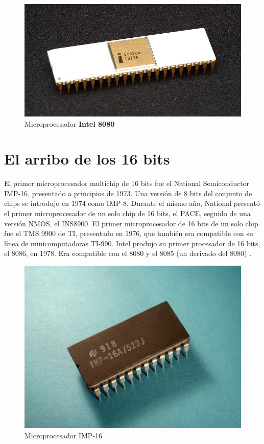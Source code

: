 \begin{figure}[htb]
	\centering
	\includegraphics[scale = 0.2]{Graphics/8080_microprocessorr.jpg}
	\caption{Microprocesador  \textbf{Intel 8080}}
	\label{fig:14}
\end{figure}

\section{El arribo de los 16 bits}

El primer microprocesador multichip de 16 bits fue el National Semiconductor IMP-16, presentado a principios de 1973. Una versión de 8 bits del conjunto de 
chips se introdujo en 1974 como IMP-8. Durante el mismo año, National presentó el primer microprocesador de un solo chip de 16 bits, el PACE, seguido de una 
versión NMOS, el INS8900. El primer microprocesador de 16 bits de un solo chip fue el TMS 9900 de TI, presentado en 1976, que también era compatible con su 
línea de minicomputadoras TI-990. Intel produjo su primer procesador de 16 bits, el 8086, en 1978. Era compatible con el 8080 y el 8085 (un derivado del 8080)
.
\begin{figure}[htb]
	\centering
	\includegraphics[scale = 0.2]{Graphics/NSIMP-16A.jpg}
	\caption{Microprocesador  IMP-16}
	\label{fig:15}
\end{figure}


